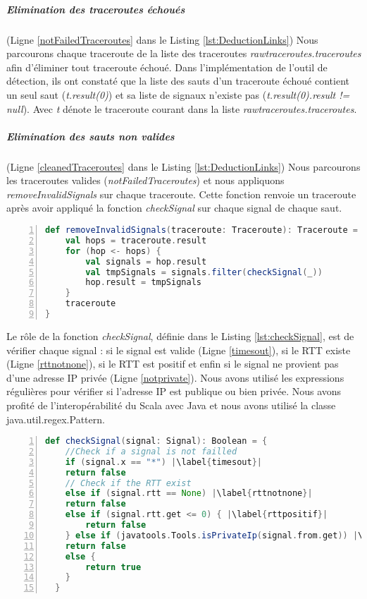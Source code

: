 \subparagraph{Elimination des traceroutes échoués} (Ligne \ref{notFailedTraceroutes} dans le Listing \ref{lst:DeductionLinks}) Nous parcourons chaque traceroute de la liste des traceroutes \textit{rawtraceroutes.traceroutes} afin d'éliminer tout traceroute échoué. Dans l'implémentation de l'outil de détection, ils ont constaté que la liste des sauts d'un traceroute échoué contient un seul saut (\textit{t.result(0)}) et sa liste de signaux n'existe pas (\textit{t.result(0).result != null}). Avec \textit{t} dénote le traceroute courant dans la liste \textit{rawtraceroutes.traceroutes}. 


\subparagraph{Elimination des sauts non valides} (Ligne \ref{cleanedTraceroutes} dans le Listing \ref{lst:DeductionLinks}) Nous parcourons les traceroutes valides (\textit{notFailedTraceroutes}) et nous appliquons  \textit{removeInvalidSignals} sur chaque traceroute. Cette fonction renvoie un traceroute après avoir appliqué la fonction \textit{checkSignal} sur chaque signal de chaque saut. 

\begin{lstlisting}[language=scala,firstnumber=1, caption={Définition de la méthode removeInvalidSignals},label={lst:removeInvalidSignals}, basicstyle = \footnotesize,escapechar=|,numbers=left,
stepnumber=1]
  def removeInvalidSignals(traceroute: Traceroute): Traceroute = {
	val hops = traceroute.result
	for (hop <- hops) {
		val signals = hop.result
		val tmpSignals = signals.filter(checkSignal(_))
		hop.result = tmpSignals
	}
	traceroute
}
\end{lstlisting}

Le rôle de la fonction \textit{checkSignal}, définie dans le Listing \ref{lst:checkSignal},  est de vérifier chaque signal : si le signal est valide (Ligne \ref{timesout}), si le RTT existe (Ligne \ref{rttnotnone}), si le RTT est positif \label{rttpositif} et enfin si le signal ne provient pas d'une adresse IP privée (Ligne \ref{notprivate}). Nous avons utilisé les expressions régulières pour vérifier si l'adresse IP est publique ou bien privée. Nous avons profité de l'interopérabilité du Scala avec Java et nous avons  utilisé la classe java.util.regex.Pattern.

\begin{lstlisting}[language=scala,firstnumber=1, caption={Définition de la méthode checkSignal},label={lst:checkSignal}, basicstyle = \footnotesize,escapechar=|,numbers=left,
stepnumber=1]
  def checkSignal(signal: Signal): Boolean = {
	//Check if a signal is not failled
	if (signal.x == "*") |\label{timesout}|
	return false
	// Check if the RTT exist
	else if (signal.rtt == None) |\label{rttnotnone}|
	return false
	else if (signal.rtt.get <= 0) { |\label{rttpositif}|
		return false
	} else if (javatools.Tools.isPrivateIp(signal.from.get)) |\label{notprivate}|
	return false
	else {
		return true
	}
  }
\end{lstlisting}

